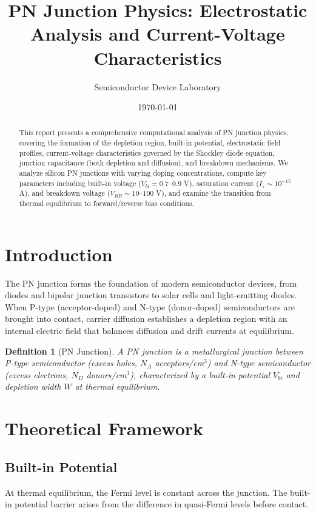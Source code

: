 \documentclass[a4paper, 11pt]{article}
\title{PN Junction Physics: Electrostatic Analysis and Current-Voltage Characteristics}
\author{Semiconductor Device Laboratory}
\date{\today}
\newtheorem{definition}{Definition}[section]
\begin{document}
\maketitle

\begin{abstract}
This report presents a comprehensive computational analysis of PN junction physics,
covering the formation of the depletion region, built-in potential, electrostatic
field profiles, current-voltage characteristics governed by the Shockley diode
equation, junction capacitance (both depletion and diffusion), and breakdown mechanisms.
We analyze silicon PN junctions with varying doping concentrations, compute key parameters
including built-in voltage ($V_{bi} = 0.7$--$0.9$ V), saturation current ($I_s \sim 10^{-15}$ A),
and breakdown voltage ($V_{BR} \sim 10$--$100$ V), and examine the transition from thermal
equilibrium to forward/reverse bias conditions.
\end{abstract}

\section{Introduction}

The PN junction forms the foundation of modern semiconductor devices, from diodes and
bipolar junction transistors to solar cells and light-emitting diodes. When P-type
(acceptor-doped) and N-type (donor-doped) semiconductors are brought into contact,
carrier diffusion establishes a depletion region with an internal electric field that
balances diffusion and drift currents at equilibrium.

\begin{definition}[PN Junction]
A PN junction is a metallurgical junction between P-type semiconductor (excess holes,
$N_A$ acceptors/cm$^3$) and N-type semiconductor (excess electrons, $N_D$ donors/cm$^3$),
characterized by a built-in potential $V_{bi}$ and depletion width $W$ at thermal equilibrium.
\end{definition}

\section{Theoretical Framework}

\subsection{Built-in Potential}

At thermal equilibrium, the Fermi level is constant across the junction. The built-in
potential barrier arises from the difference in quasi-Fermi levels before contact.
\end{document}
